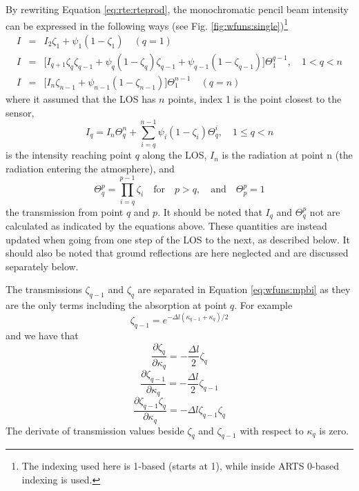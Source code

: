  By rewriting Equation \ref{eq:rte:rteprod}, the monochromatic pencil beam
 intensity can be expressed in the following ways (see Fig. 
 \ref{fig:wfuns:single})\footnote{The indexing used here is 1-based 
  (starts at 1), while inside ARTS 0-based indexing is used.}
 \begin{eqnarray}
   I &=& I_2\zeta_1+\psi_1(1-\zeta_1) \quad (q=1) 
     \nonumber \\
   I &=&\Big[I_{q+1}\zeta_q\zeta_{q-1}+\psi_q(1-\zeta_q)\zeta_{q-1} +
            \psi_{q-1}(1-\zeta_{q-1}) \Big] \Theta^{q-1}_1, \quad 1<q<n 
    \label{eq:wfuns:mpbi} \\
   I &=& \Big[I_n\zeta_{n-1}+\psi_{n-1}(1-\zeta_{n-1})\Big]\Theta^{n-1}_{1}
     \quad (q=n)
     \nonumber
 \end{eqnarray}
 where it assumed that the LOS has $n$ points, index 1 is the point
 closest to the sensor,
 \begin{equation}
   I_q = I_n \Theta^{n}_{q} + \sum_{i=q}^{n-1}\psi_i(1-\zeta_i) 
             \Theta_{q}^{i}, \quad 1 \leq q < n
  \label{eq:wfuns:iq}
 \end{equation}
 is the intensity reaching point $q$ along the LOS, $I_n$ is the radiation at
 point n (the radiation entering the atmosphere), and
 \begin{equation}
   \Theta_q^p = \prod_{i=q}^{p-1}\zeta_i\quad \mathrm{for} \quad p>q, 
     \quad \mathrm{and} \quad \Theta_p^p = 1
  \label{eq:wfuns:Theta}
 \end{equation}
 the transmission from point $q$ and $p$. It should be noted that
 $I_q$ and $\Theta_q^p$ not are calculated as indicated by the
 equations above. These quantities are instead updated when going from
 one step of the LOS to the next, as described below. It should also be
 noted that ground reflections are here neglected and are discussed 
 separately below.

 The transmissions $\zeta_{q-1}$ and $\zeta_q$ are separated in Equation
 \ref{eq:wfuns:mpbi} as they are the only terms including the absorption
 at point $q$. For example
 \begin{equation}
   \zeta_{q-1} = e^{-\Delta l(\kappa_{q-1}+\kappa_q)/2}
 \end{equation}
 and we have that
 \begin{equation}
   \frac{\partial \zeta_q}{\partial \kappa_q} = -\frac{\Delta l}{2}\zeta_q
  \label{eq:wfuns:dzeta1}
 \end{equation}
 \begin{equation}
   \frac{\partial\zeta_{q-1}}{\partial \kappa_q}=-\frac{\Delta l}{2}\zeta_{q-1}
 \end{equation}
 \begin{equation}
   \frac{\partial \zeta_{q-1}\zeta_q}{\partial \kappa_q} = 
          -\Delta l \zeta_{q-1}\zeta_q
  \label{eq:wfuns:dzeta2}
 \end{equation}
 The derivate of transmission values beside $\zeta_q$ and
 $\zeta_{q-1}$ with respect to $\kappa_q$ is zero.


